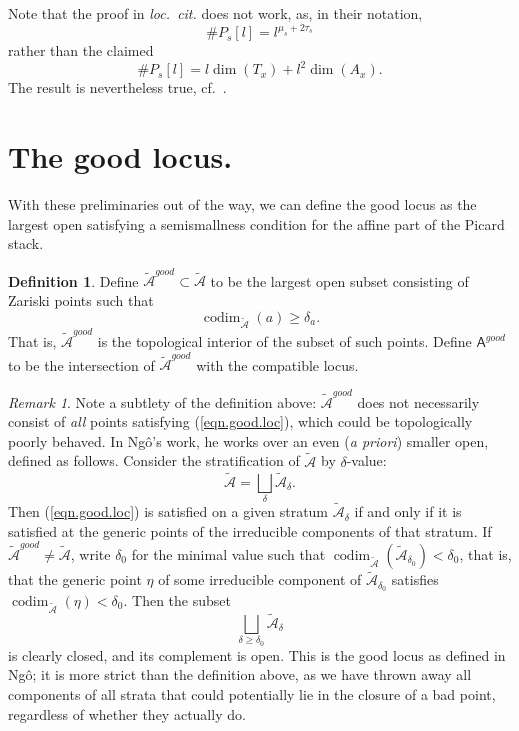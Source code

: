 \documentclass[openany]{amsbook}
\theoremstyle{definition}
\newtheorem{definition}[theorem]{Definition}
\theoremstyle{remark}
\newtheorem{remark}[theorem]{Remark}
\numberwithin{equation}{section}
\newcommand{\cA}{\mathcal{A}}
\renewcommand{\-}{\operatorname{-}}
\newcommand{\on}[1]{\operatorname{#1}}
\newcommand{\good}{\mathit{good}}
\newcommand{\ctA}{\widetilde{\cA}}
\newcommand{\bA}{\mathsf{A}}
\newcommand{\codim}{\on{codim}}
\begin{document}
Note that the proof in \textit{loc.\ cit.} does not work, as, in their notation,
$$
    \# P_s[l] = l^{\mu_s + 2\tau_s}
$$
rather than the claimed
$$
    \# P_s[l] = l \dim(T_x) + l^2 \dim(A_x).
$$
The result is nevertheless true, cf.\ \cite[Exp.\ X, Remarques 8.7]{SGAIII}.

\section{\texorpdfstring{The good locus.}{The good locus.}}

With these preliminaries out of the way, we can define the good locus as the largest open satisfying a semismallness condition for the affine part of the Picard stack.

\begin{definition}\label{def.good.locus}
    Define $\ctA^{\good} \subset \ctA$ to be the largest open subset consisting of Zariski points such that 
    \begin{equation}\label{eqn.good.loc}
        \codim_{\ctA}(a) \ge \delta_a. 
    \end{equation}
    That is, $\ctA^{\good}$ is the topological interior of the subset of such points. Define $\bA^{\good}$ to be the intersection of $\ctA^{\good}$ with the compatible locus.
\end{definition}



\begin{remark}
    Note a subtlety of the definition above: $\ctA^{\good}$ does not necessarily consist of \emph{all} points satisfying (\ref{eqn.good.loc}), which could be topologically poorly behaved. In Ng\^{o}'s work, he works over an even (\textit{a priori}) smaller open, defined as follows. Consider the stratification of $\ctA$ by $\delta$-value:
    $$
        \ctA = \bigsqcup_\delta \ctA_{\delta}.
    $$
    Then (\ref{eqn.good.loc}) is satisfied on a given stratum $\ctA_{\delta}$ if and only if it is satisfied at the generic points of the irreducible components of that stratum. If $\ctA^{\good} \neq \ctA$, write $\delta_0$ for the minimal value such that $\codim_{\ctA}(\ctA_{\delta_0}) < \delta_0$, that is, that the generic point $\eta$ of some irreducible component of $\ctA_{\delta_0}$ satisfies $\codim_{\ctA}(\eta) < \delta_0$. Then the subset
    $$
        \bigsqcup_{\delta \ge \delta_0} \ctA_{\delta}
    $$
    is clearly closed, and its complement is open. This is the good locus as defined in Ng\^{o}; it is more strict than the definition above, as we have thrown away all components of all strata that could potentially lie in the closure of a bad point, regardless of whether they actually do.
\end{remark}
\end{document}
